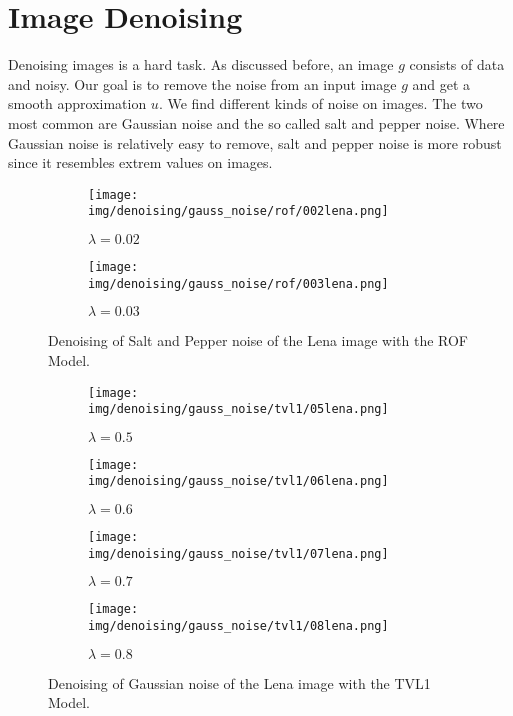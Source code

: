 \section{Image Denoising} %
\label{sec:image_denoising}
    
    Denoising images is a hard task. As discussed before, an image $g$ consists of data and noisy. Our goal is to remove the noise from an input image $g$ and get a smooth approximation $u$. We find different kinds of noise on images. The two most common are Gaussian noise and the so called salt and pepper noise. Where Gaussian noise is relatively easy to remove, salt and pepper noise is more robust since it resembles extrem values on images. 

\begin{figure}[ht]
    \centering
    \begin{subfigure}[b]{0.45\textwidth}
        \texttt{[image: img/denoising/gauss\_noise/rof/002lena.png]}
        \caption{$\lambda = 0.02$}
    \end{subfigure}
    \begin{subfigure}[b]{0.45\textwidth}
        \texttt{[image: img/denoising/gauss\_noise/rof/003lena.png]}
        \caption{$\lambda = 0.03$}
    \end{subfigure}
    \caption{Denoising of Salt and Pepper noise of the Lena image with the ROF Model.}
\label{fig:denoising_lena_rof_gauss}
\end{figure}

\begin{figure}[ht]
    \centering
    \begin{subfigure}[b]{0.45\textwidth}
        \texttt{[image: img/denoising/gauss\_noise/tvl1/05lena.png]}
        \caption{$\lambda = 0.5$}
    \end{subfigure}
    \begin{subfigure}[b]{0.45\textwidth}
        \texttt{[image: img/denoising/gauss\_noise/tvl1/06lena.png]}
        \caption{$\lambda = 0.6$}
    \end{subfigure}
    \begin{subfigure}[b]{0.45\textwidth}
        \texttt{[image: img/denoising/gauss\_noise/tvl1/07lena.png]}
        \caption{$\lambda = 0.7$}
    \end{subfigure}
    \begin{subfigure}[b]{0.45\textwidth}
        \texttt{[image: img/denoising/gauss\_noise/tvl1/08lena.png]}
        \caption{$\lambda = 0.8$}
    \end{subfigure}
    \caption{Denoising of Gaussian noise of the Lena image with the TVL1 Model.}
\label{fig:denoising_lena_tvl1_gauss}
\end{figure}

